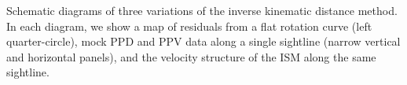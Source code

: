 \label{fig:diagram} Schematic diagrams of three variations of the inverse kinematic distance method. In each diagram, we show a map of residuals from a flat rotation curve (left quarter-circle), mock PPD and PPV data along a single sightline (narrow vertical and horizontal panels), and the velocity structure of the ISM along the same sightline. 